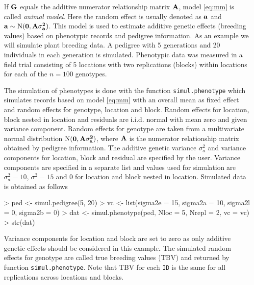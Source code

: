 \documentclass[a4paper,11pt]{article}
\begin{document}
If $\bf G$ equals the additive numerator relationship matrix $\bf A$, model \eqref{eq:mm} is called \textit{animal model}. Here the random effect is usually denoted as $\bf a$ and $ \bf a \sim \text{N}( \bf 0, \bf A \sigma^2_a)$.  This model is used to estimate additive genetic effects (breeding values) based on phenotypic records and pedigree information.
 As an example we will simulate plant breeding data. A pedigree with 5 generations and 20 individuals in each generation is simulated. Phenotypic data was measured in a field trial consisting of 5 locations with two replications (blocks) within locations for each of the $n=100$ genotypes.

The simulation of phenotypes is done with the function \texttt{simul.phenotype} which simulates records based on model \eqref{eq:mm} with an overall mean as fixed effect and random effects for genotype, location and block. Random effects for location, block nested in location and residuals are i.i.d. normal with mean zero and given variance component.
Random effects for genotype are taken from a multivariate normal distribution $\text{N}( \bf 0, \bf A \sigma^2_a)$, where $\bf A$ is the numerator relationship matrix obtained by pedigree information. The additive genetic variance $\sigma^2_a$ and variance components for location, block and residual are specified by the user. 
Variance components are specified in a separate list and values used for simulation are $\sigma^2_a=10$, $\sigma^2=15$ and $0$ for location and block nested in location. Simulated data is obtained as follows
\begin{Schunk}
\begin{Sinput}
> ped <- simul.pedigree(5, 20)
> vc <- list(sigma2e = 15, sigma2a = 10, sigma2l = 0, sigma2b = 0)
> dat <- simul.phenotype(ped, Nloc = 5, Nrepl = 2, vc = vc)
> str(dat)
\end{Sinput}
\end{Schunk}
Variance components for location and block are set to zero as only additive genetic effects should be considered in this example. The simulated random effects for 
genotype are called true breeding values (TBV) and returned by function \texttt{simul.phenotype}. Note that TBV for each \texttt{ID} is the same for all replications across locations and blocks.
                                                                                                                                   
\end{document}
